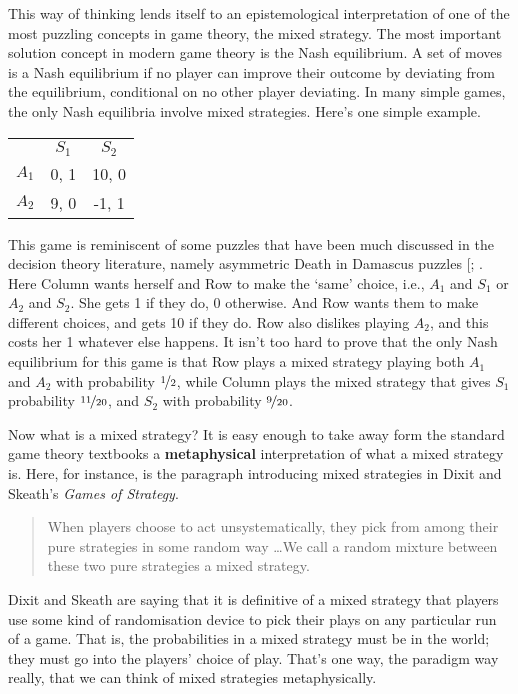 \documentclass[11pt,]{book}
\def\toprule{}
\def\bottomrule{}
\begin{document}
This way of thinking lends itself to an epistemological interpretation of one of the most puzzling concepts in game theory, the mixed strategy. The most important solution concept in modern game theory is the Nash equilibrium. A set of moves is a Nash equilibrium if no player can improve their outcome by deviating from the equilibrium, conditional on no other player deviating. In many simple games, the only Nash equilibria involve mixed strategies. Here's one simple example.

\begin{longtable}[]{@{}lcc@{}}
\toprule
\endhead
& \(S_1\) & \(S_2\)\tabularnewline
\(A_1\) & 0, 1 & 10, 0\tabularnewline
\(A_2\) & 9, 0 & -1, 1\tabularnewline
\bottomrule
\end{longtable}

This game is reminiscent of some puzzles that have been much discussed in the decision theory literature, namely asymmetric Death in Damascus puzzles {[}\citet{Richter1984}; . Here Column wants herself and Row to make the `same' choice, i.e., \(A_1\) and \(S_1\) or \(A_2\) and \(S_2\). She gets 1 if they do, 0 otherwise. And Row wants them to make different choices, and gets 10 if they do. Row also dislikes playing \(A_2\), and this costs her 1 whatever else happens. It isn't too hard to prove that the only Nash equilibrium for this game is that Row plays a mixed strategy playing both \(A_1\) and \(A_2\) with probability \(\nicefrac{1}{2}\), while Column plays the mixed strategy that gives \(S_1\) probability \(\nicefrac{11}{20}\), and \(S_2\) with probability \(\nicefrac{9}{20}\).

Now what is a mixed strategy? It is easy enough to take away form the standard game theory textbooks a \textbf{metaphysical} interpretation of what a mixed strategy is. Here, for instance, is the paragraph introducing mixed strategies in Dixit and Skeath's \emph{Games of Strategy}.

\begin{quote}
When players choose to act unsystematically, they pick from among their pure strategies in some random way \ldots{}We call a random mixture between these two pure strategies a mixed strategy. \citep[ 186]{DixitSkeath2004}
\end{quote}

Dixit and Skeath are saying that it is definitive of a mixed strategy that players use some kind of randomisation device to pick their plays on any particular run of a game. That is, the probabilities in a mixed strategy must be in the world; they must go into the players' choice of play. That's one way, the paradigm way really, that we can think of mixed strategies metaphysically.
\end{document}
